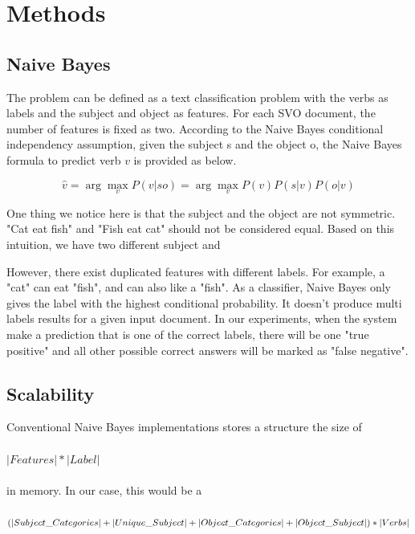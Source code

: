 \section{Methods}

\subsection{Naive Bayes}

The problem can be defined as a text classification problem with the verbs as labels and the subject and object as features. For each SVO document, the number of features is fixed as two. According to the Naive Bayes conditional independency assumption, given the subject s and the object o, the Naive Bayes formula to predict verb $v$ is provided as below.

\begin{equation}
	\hat{v} = \arg\max_v P(v|so) = \arg\max_v P(v)P(s|v)P(o|v)
\end{equation}

One thing we notice here is that the subject and the object are not symmetric. "Cat eat fish" and "Fish eat cat" should not be considered equal. Based on this intuition, we have two different subject and 

However, there exist duplicated features with different labels. For example, a "cat" can eat "fish", and can also like a "fish". As a classifier, Naive Bayes only gives the label with the highest conditional probability. It doesn't produce multi labels results for a given input document. In our experiments, when the system make a prediction that is one of the correct labels, there will be one "true positive" and all other possible correct answers will be marked as "false negative".

\subsection{Scalability}

Conventional Naive Bayes implementations stores a structure the size of \\
\\
$|Features| * |Label|$ \\
\\
in memory. In our case, this would be a \\
\\
$(|Subject\_Categories|+|Unique\_Subject|\\+|Object\_Categories|+|Object\_Subject|) * |Verbs|$ \\

